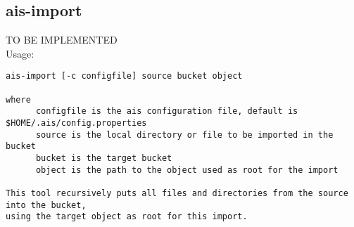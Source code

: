 \documentclass[11pt]{article}
\begin{document}
\subsection{ais-import}
TO BE IMPLEMENTED\\
Usage:\\
\begin{verbatim}
ais-import [-c configfile] source bucket object

where 
      configfile is the ais configuration file, default is $HOME/.ais/config.properties
      source is the local directory or file to be imported in the bucket
      bucket is the target bucket
      object is the path to the object used as root for the import
      
This tool recursively puts all files and directories from the source into the bucket,
using the target object as root for this import.
\end{verbatim}
\end{document}
